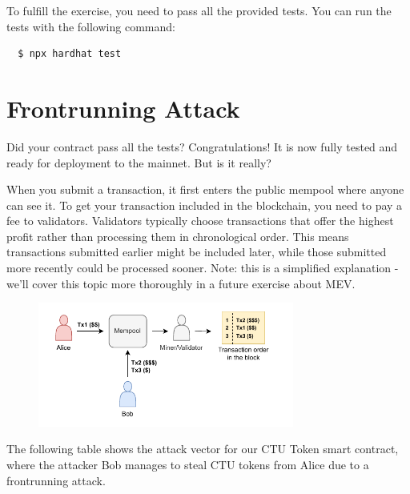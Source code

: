 \documentclass[12pt]{article}
\begin{document}
\noindent
To fulfill the exercise, you need to pass all the provided tests. You can run the tests with the following command:
\begin{verbatim}
  $ npx hardhat test
\end{verbatim}

\section{Frontrunning Attack}

Did your contract pass all the tests? Congratulations! It is now fully tested and ready for deployment to the mainnet. But is it really?

When you submit a transaction, it first enters the public mempool where anyone can see it. To get your transaction included in the blockchain, you need to pay a fee to validators. Validators typically choose transactions that offer the highest profit rather than processing them in chronological order. This means transactions submitted earlier might be included later, while those submitted more recently could be processed sooner. Note: this is a simplified explanation - we'll cover this topic more thoroughly in a future exercise about MEV.

\begin{figure}[H]
\centering
\includegraphics[width=0.75\textwidth]{sandwich.pdf}
\label{fig:frontrunning}
\end{figure}

The following table shows the attack vector for our CTU Token smart contract, where the attacker Bob manages to steal CTU tokens from Alice due to a frontrunning attack.
\end{document}
